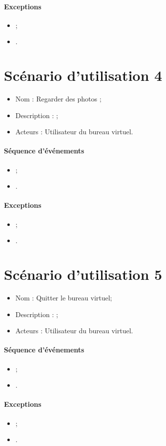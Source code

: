 \paragraph{Exceptions}
\begin{itemize}
	\item ;
	\item .
\end{itemize}


\section{Scénario d'utilisation 4}
\begin{itemize}
	\item Nom : Regarder des photos ;
	\item Description :  ;
	\item Acteurs : Utilisateur du bureau virtuel.
\end{itemize}

\paragraph{Séquence d'événements}
\begin{itemize}
	\item ;
	\item .
\end{itemize}

\paragraph{Exceptions}
\begin{itemize}
	\item ;
	\item .
\end{itemize}


\section{Scénario d'utilisation 5}
\begin{itemize}
	\item Nom : Quitter le bureau virtuel;
	\item Description :  ;
	\item Acteurs : Utilisateur du bureau virtuel.
\end{itemize}

\paragraph{Séquence d'événements}
\begin{itemize}
	\item ;
	\item .
\end{itemize}

\paragraph{Exceptions}
\begin{itemize}
	\item ;
	\item .
\end{itemize}

